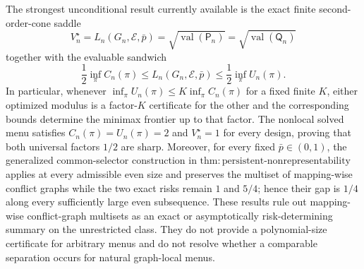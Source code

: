 The strongest unconditional result currently available is the exact finite second-order-cone saddle
\[
 V_n^\star=L_n(G_n,\mathcal E,\bar p)
 =\sqrt{\operatorname{val}(\mathsf P_n)}
 =\sqrt{\operatorname{val}(\mathsf Q_n)}
\]
together with the evaluable sandwich
\[
 \frac12\inf_\pi C_n(\pi)
 \le L_n(G_n,\mathcal E,\bar p)
 \le\frac12\inf_\pi U_n(\pi).
\]
In particular, whenever \(\inf_\pi U_n(\pi)\le K\inf_\pi C_n(\pi)\) for a fixed finite \(K\), either optimized modulus is a factor-\(K\) certificate for the other and the corresponding bounds determine the minimax frontier up to that factor.  The nonlocal solved menu satisfies \(C_n(\pi)=U_n(\pi)=2\) and \(V_n^\star=1\) for every design, proving that both universal factors \(1/2\) are sharp.  Moreover, for every fixed \(\bar p\in(0,1)\), the generalized common-selector construction in \(\mathrm{thm{:}persistent\text{-}nonrepresentability}\) applies at every admissible even size and preserves the multiset of mapping-wise conflict graphs while the two exact risks remain \(1\) and \(5/4\); hence their gap is \(1/4\) along every sufficiently large even subsequence.  These results rule out mapping-wise conflict-graph multisets as an exact or asymptotically risk-determining summary on the unrestricted class.  They do not provide a polynomial-size certificate for arbitrary menus and do not resolve whether a comparable separation occurs for natural graph-local menus.